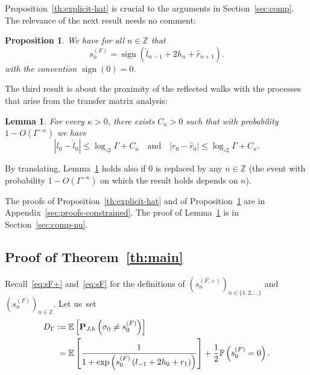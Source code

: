 \documentclass[10pt]{amsart}
\newtheorem{lemm}[theo]{Lemma}\newtheorem{prop}[theo]{Proposition}\newtheorem{coro}[theo]{Corollary}\newtheorem{conj}[theo]{Conjecture}
\theoremstyle{definition}\newtheorem{defi}[theo]{Definition}\newtheorem{rema}[theo]{Remark}\newtheorem{exam}[theo]{Example}\newtheorem{exem}[theo]{Example}\newtheorem{nota}[theo]{Notation}
\newcommand{\bP}{\mathbf{P}}
\newcommand{\bbE}{\mathbb{E}}
\newcommand{\bbP}{\mathbb{P}}
\newcommand{\bbZ}{\mathbb{Z}}
\newcommand{\gG}{\Gamma}
\newcommand{\gs}{\sigma}
\newcommand{\ls}{\widehat{l}}
\newcommand{\rs}{\widehat{r}}
\newcommand{\loglog}{\log_{\circ 2}}
\DeclareMathOperator{\sign}{\mathrm{sign}}
\newcommand*{\Mk}{\mkern -2mu}
\newcommand*{\MK}{\mkern 2mu}
\begin{document}
\pagebreak

Proposition~\ref{th:explicit-hat} is crucial to the arguments in Section~\ref{sec:comp}. The relevance of the next result needs no comment:
\begin{prop}\label{th:lr-Fisher}
We have for all $n\in\bbZ$ that
\begin{equation}\label{eq:lr-Fisher}
s^{(F)}_n= \sign\left(\ls_{n-1}+2h_n + \rs_{n+1} \right).
\end{equation}
with the convention $\sign(0)=0$.
\end{prop}


The third result is about the proximity of the reflected walks with the processes that arise from the transfer matrix analysis:


\begin{lemm}\label{th:modelsclose2}
For every $\kappa>0$, there exists $C_\kappa>0$ such that with probability $1-O(\Gamma^{-\kappa})$ we have
\begin{equation}\label{lapproxls}
|l_0-\ls_0|\le \loglog \Gamma + C_\kappa\quad \text{and} \quad \left| r_0-\rs_0\right|\le \loglog \Gamma + C_\kappa.
\end{equation}
\end{lemm}


By translating, Lemma~\ref{th:modelsclose2} holds also if $0$ is replaced by any $n\in \bbZ$ (the event with probability $1-O(\Gamma^{-\kappa})$ on which the result holds depends on $n$).


The proofs of Proposition~\ref{th:explicit-hat} and of Proposition~\ref{th:lr-Fisher} are in Appendix~\ref{sec:proofs-constrained}. The proof of Lemma~\ref{th:modelsclose2} is in Section~\ref{sec:comp-nu}.


\subsection{Proof of Theorem~\ref{th:main}}\label{sec:mainproof}

Recall~\eqref{eq:sF+} and~\eqref{eq:sF} for the definitions of $(s^{(F, +)}_n)_{n\in \{1,2, \dots\}}$ and $(s^{(F)}_n)_{n\in \bbZ}$. Let us~set
\begin{equation}\label{eq:DgGdef}
\begin{aligned}[t]
D_\gG \,\MK &\!\Mk:=  \bbE\left[\bP_{J, h}\left(\gs_0\neq s^{(F)}_0\right)\right]\\ &= \bbE \left[
\frac {1}{1+ \exp\left(s^{(F)}_0\left(l_{-1} +2h_0+ r_{1}\right)\right)}
\right] + \frac12 \bbP \left(s^{(F)}_0 =0 \right).
\end{aligned}
\end{equation}
\end{document}
